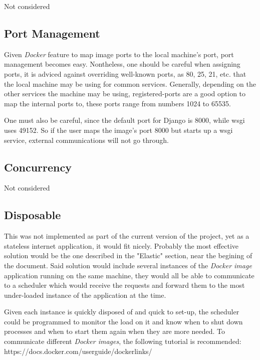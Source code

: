 \documentclass[10pt]{article}
\begin{document}
 Not considered
 
 \subsection{Port Management}
 
Given \textit{Docker} feature to map image ports to the local machine's port, port management becomes easy. Nontheless, one should be careful when assigning ports, it is adviced against overriding well-known ports, as 80, 25, 21, etc. that the local machine may be using for common services. Generally, depending on the other services the machine may be using, registered-ports are a good option to map the internal ports to, these ports range from numbers 1024 to 65535. 

One must also be careful, since the default port for Django is 8000, while wsgi uses 49152. So if the user maps the image's port 8000 but starts up a wsgi service, external communications will not go through.
 
 \subsection{Concurrency}
 
 Not considered
 
 \subsection{Disposable}
 
This was not implemented as part of the current version of the project, yet as a stateless internet application, it would fit nicely. Probably the most effective solution would be the one described in the "Elastic" section, near the begining of the document. Said solution would include several instances of the \textit{Docker image} application running on the same machine, they would all be able to communicate to a scheduler which would receive the requests and forward them to the most under-loaded instance of the application at the time. 

Given each instance is quickly disposed of and quick to set-up, the scheduler could be programmed to monitor the load on it and know when to shut down processes and when to start them again when they are more needed. To communicate different \textit{Docker images}, the following tutorial is recommended:\\

https://docs.docker.com/userguide/dockerlinks/\\
 
\end{document}
